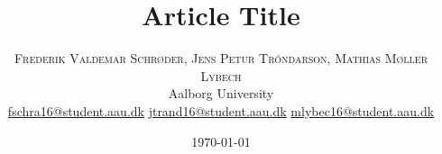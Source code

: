 %
%
%
%




\setlength{\droptitle}{-4\baselineskip} %

\pretitle{\begin{center}\Huge\bfseries} %
\posttitle{\end{center}} %
\title{Article Title} %
\author{%
\textsc{Frederik Valdemar Schrøder, Jens Petur Tróndarson, Mathias Møller Lybech} \\[1ex] %
\normalsize Aalborg University \\ %
\normalsize \href{mailto:fschra16@student.aau.dk}{fschra16@student.aau.dk} %
\normalsize \href{mailto:jtrand16@student.aau.dk}{jtrand16@student.aau.dk} %
\normalsize \href{mailto:mlybec16@student.aau.dk}{mlybec16@student.aau.dk} %
}
\date{\today} %
\renewcommand{\maketitlehookd}{%
\begin{abstract}
\noindent \blindtext %
\end{abstract}
}

\lstset{
	basicstyle=\footnotesize,
	numbers=left, 
	numberstyle=\tiny, 
	framexleftmargin=0pt,
	breaklines=true,
	tabsize=2
}



